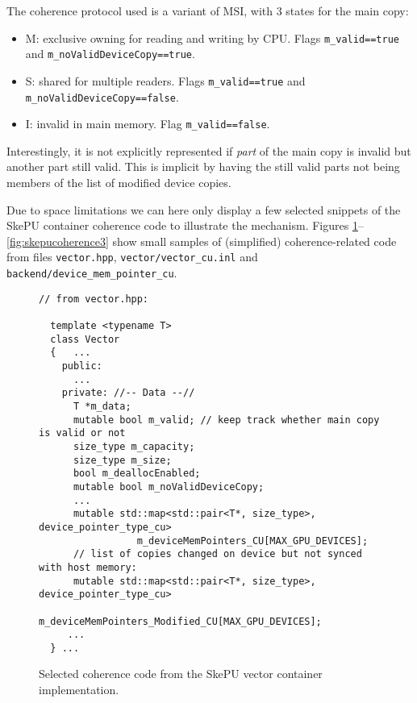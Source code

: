 The coherence protocol used is a variant of MSI, with 3 states for the main copy:
\begin{itemize}
\item M: exclusive owning for reading and writing by CPU.
         Flags \verb+m_valid==true+ and \verb+m_noValidDeviceCopy==true+.
\item S: shared for multiple readers.  
         Flags \verb+m_valid==true+ and 
               \verb+m_noValidDeviceCopy==false+.
\item I: invalid in main memory.  Flag \verb+m_valid==false+.
\end{itemize}

Interestingly, it is not explicitly represented if \emph{part} of 
the main copy is invalid but another part still valid. 
This is implicit by having the still valid parts not
being members of the list of modified device copies.


Due to space limitations we can here only display a few selected 
snippets of the SkePU container coherence code to illustrate the mechanism.
Figures \ref{fig:skepucoherence1}--\ref{fig:skepucoherence3} show small
samples of (simplified) coherence-related
code from files \texttt{vector.hpp}, %
 \texttt{vector/vector\_cu.inl} and \texttt{backend/device\_mem\_pointer\_cu}.

\begin{figure}
\begin{small}
\begin{verbatim}
// from vector.hpp:

  template <typename T>
  class Vector
  {   ...
    public:
      ...
    private: //-- Data --//
      T *m_data;
      mutable bool m_valid; // keep track whether main copy is valid or not
      size_type m_capacity;
      size_type m_size;
      bool m_deallocEnabled;
      mutable bool m_noValidDeviceCopy;
      ...
      mutable std::map<std::pair<T*, size_type>, device_pointer_type_cu>
                 m_deviceMemPointers_CU[MAX_GPU_DEVICES];
      // list of copies changed on device but not synced with host memory:
      mutable std::map<std::pair<T*, size_type>, device_pointer_type_cu>
                 m_deviceMemPointers_Modified_CU[MAX_GPU_DEVICES];
     ...
  } ...
\end{verbatim}
\end{small}

\vspace{-3mm}
\caption{\label{fig:skepucoherence1}Selected coherence code from the SkePU vector container implementation.}
\end{figure}
  
